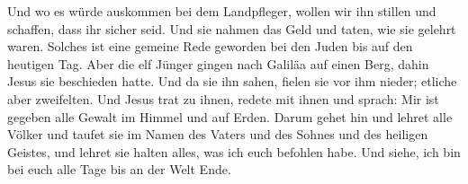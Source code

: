  Und wo es würde auskommen bei dem Landpfleger, wollen wir
ihn stillen und schaffen, dass ihr sicher seid.  Und sie
nahmen das Geld und taten, wie sie gelehrt waren. Solches ist eine
gemeine Rede geworden bei den Juden bis auf den heutigen Tag.
 Aber die elf Jünger gingen nach Galiläa auf einen Berg,
dahin Jesus sie beschieden hatte.  Und da sie ihn sahen,
fielen sie vor ihm nieder; etliche aber zweifelten.  Und
Jesus trat zu ihnen, redete mit ihnen und sprach: Mir ist gegeben alle
Gewalt im Himmel und auf Erden.  Darum gehet hin und lehret
alle Völker und taufet sie im Namen des Vaters und des Sohnes und des
heiligen Geistes,  und lehret sie halten alles, was ich
euch befohlen habe. Und siehe, ich bin bei euch alle Tage bis an der
Welt Ende.
